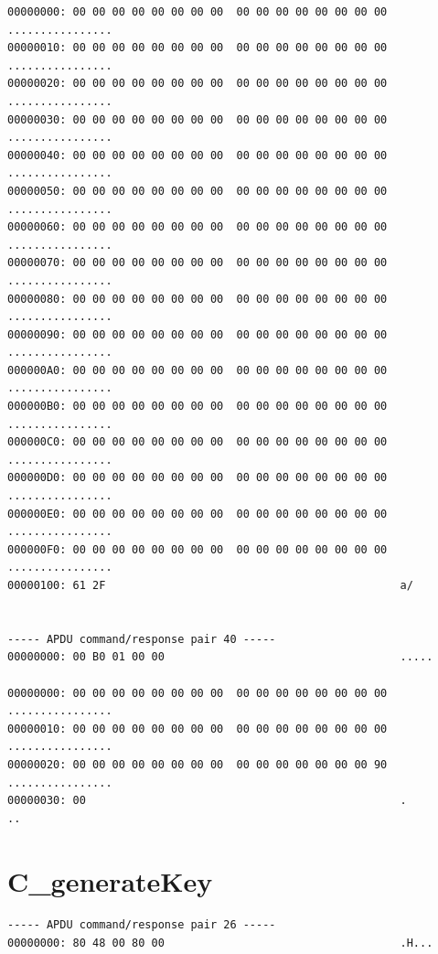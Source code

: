 \documentclass[bsc,frontabs,twoside,singlespacing,parskip,deptreport]{infthesis}     %
\begin{document}
\begin{appendices}
\begin{Verbatim}[commandchars=\\\{\}, fontsize=\small]
00000000: 00 00 00 00 00 00 00 00  00 00 00 00 00 00 00 00  ................
00000010: 00 00 00 00 00 00 00 00  00 00 00 00 00 00 00 00  ................
00000020: 00 00 00 00 00 00 00 00  00 00 00 00 00 00 00 00  ................
00000030: 00 00 00 00 00 00 00 00  00 00 00 00 00 00 00 00  ................
00000040: 00 00 00 00 00 00 00 00  00 00 00 00 00 00 00 00  ................
00000050: 00 00 00 00 00 00 00 00  00 00 00 00 00 00 00 00  ................
00000060: 00 00 00 00 00 00 00 00  00 00 00 00 00 00 00 00  ................
00000070: 00 00 00 00 00 00 00 00  00 00 00 00 00 00 00 00  ................
00000080: 00 00 00 00 00 00 00 00  00 00 00 00 00 00 00 00  ................
00000090: 00 00 00 00 00 00 00 00  00 00 00 00 00 00 00 00  ................
000000A0: 00 00 00 00 00 00 00 00  00 00 00 00 00 00 00 00  ................
000000B0: 00 00 00 00 00 00 00 00  00 00 00 00 00 00 00 00  ................
000000C0: 00 00 00 00 00 00 00 00  00 00 00 00 00 00 00 00  ................
000000D0: 00 00 00 00 00 00 00 00  00 00 00 00 00 00 00 00  ................
000000E0: 00 00 00 00 00 00 00 00  00 00 00 00 00 00 00 00  ................
000000F0: 00 00 00 00 00 00 00 00  00 00 00 00 00 00 00 00  ................
00000100: 61 2F                                             a/


----- APDU command/response pair 40 -----
00000000: 00 B0 01 00 00                                    .....

00000000: 00 00 00 00 00 00 00 00  00 00 00 00 00 00 00 00  ................
00000010: 00 00 00 00 00 00 00 00  00 00 00 00 00 00 00 00  ................
00000020: 00 00 00 00 00 00 00 00  00 00 00 00 00 00 00 90  ................
00000030: 00                                                .                                       ..
\end{Verbatim}
\pagebreak

\section{C\_generateKey}
\begin{Verbatim}[commandchars=\\\{\}, fontsize=\small]
----- APDU command/response pair 26 -----
00000000: 80 48 00 80 00                                    .H...


\end{Verbatim}
\end{appendices}
\end{document}
